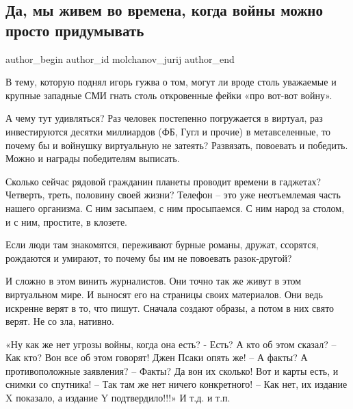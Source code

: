  
 
 
 
 
 
\subsection{Да, мы живем во времена, когда войны можно просто придумывать}
\label{sec:31_01_2022.fb.molchanov_jurij.1.vremena_vojny_pridumyvat}
 
\ifcmt
 author_begin
   author_id molchanov_jurij
 author_end
\fi

В тему, которую поднял игорь гужва о том, могут ли вроде столь уважаемые и
крупные западные СМИ гнать столь откровенные фейки «про вот-вот войну».

А чему тут удивляться? Раз человек постепенно погружается в виртуал, раз
инвестируются десятки миллиардов (ФБ, Гугл и прочие) в метавселенные, то почему
бы и войнушку виртуальную не затеять? Развязать, повоевать и победить. Можно и
награды победителям выписать.

Сколько сейчас рядовой гражданин планеты проводит времени в гаджетах? Четверть,
треть, половину своей жизни? Телефон – это уже неотъемлемая часть нашего
организма. С ним засыпаем, с ним просыпаемся. С ним народ за столом, и с ним,
простите, в клозете.

Если люди там знакомятся, переживают бурные романы, дружат, ссорятся, рождаются
и умирают, то почему бы им не повоевать разок-другой?

И сложно в этом винить журналистов. Они точно так же живут в этом виртуальном
мире. И выносят его на страницы своих материалов. Они ведь искренне верят в то,
что пишут. Сначала создают образы, а потом в них свято верят. Не со зла,
нативно.

«Ну как же нет угрозы войны, когда она есть? - Есть? А кто об этом сказал? –
Как кто? Вон все об этом говорят! Джен Псаки опять же! – А факты? А
противоположные заявления? – Факты? Да вон их сколько! Вот и карты есть, и
снимки со спутника! – Так там же нет ничего конкретного! – Как нет, их издание
X показало, а издание Y подтвердило!!!» И т.д. и т.п.

